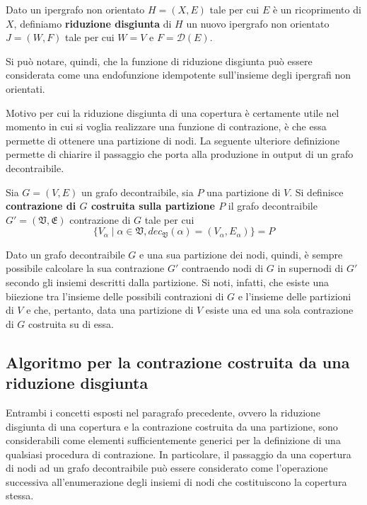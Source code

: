 \begin{definition}
    Dato un ipergrafo non orientato $H = (X, E)$ tale per cui $E$ \`e un ricoprimento di $X$,
    definiamo \textbf{riduzione disgiunta} di $H$ un nuovo ipergrafo non orientato $J = (W, F)$
    tale per cui $W = V$ e $F = \mathcal{D}(E)$.
\end{definition}

Si pu\`o notare, quindi, che la funzione di riduzione disgiunta pu\`o essere considerata come una
endofunzione idempotente sull'insieme degli ipergrafi non orientati.

Motivo per cui la riduzione disgiunta di una copertura è certamente utile nel momento in cui si voglia
realizzare una funzione di contrazione, è che essa permette di ottenere una partizione di nodi.
La seguente ulteriore definizione permette di chiarire il passaggio che porta alla produzione in output di un grafo
decontraibile.

\begin{definition}
Sia $G = (V, E)$ un grafo decontraibile, sia $P$ una partizione di $V$.
Si definisce \textbf{contrazione di $G$ costruita sulla partizione $P$} il grafo decontraibile
$G' = (\mathfrak{V}, \mathfrak{E})$ contrazione di $G$ tale per cui
    \begin{equation*}
        \{V_\alpha \mid \alpha \in \mathfrak{V}, dec_{\mathfrak{V}}(\alpha) = (V_\alpha, E_\alpha)\} = P
    \end{equation*}
\end{definition}

Dato un grafo decontraibile $G$ e una sua partizione dei nodi, quindi, è sempre possibile calcolare la sua
contrazione $G'$ contraendo nodi di $G$ in supernodi di $G'$ secondo gli insiemi descritti dalla partizione.
Si noti, infatti, che esiste una biiezione tra l'insieme delle possibili contrazioni di $G$ e l'insieme delle
partizioni di $V$ e che, pertanto, data una partizione di $V$ esiste una ed una sola contrazione di $G$ costruita
su di essa.

\subsection{Algoritmo per la contrazione costruita da una riduzione disgiunta}\label{sec:make_decontractible_graph}
Entrambi i concetti esposti nel paragrafo precedente, ovvero la riduzione disgiunta di una copertura e la
contrazione costruita da una partizione, sono considerabili come elementi sufficientemente generici
per la definizione di una qualsiasi procedura di contrazione.
In particolare, il passaggio da una copertura
di nodi ad un grafo decontraibile può essere considerato come l'operazione successiva all'enumerazione degli
insiemi di nodi che costituiscono la copertura stessa. \newline

